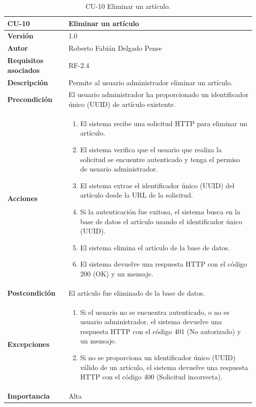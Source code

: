 \begin{table}[p]
	\centering
	\begin{tabularx}{\linewidth}{ p{} p{} }
		\toprule
		\textbf{CU-10}    & \textbf{Eliminar un artículo}\\
		\toprule
		\textbf{Versión}              & 1.0    \\
		\textbf{Autor}                & Roberto Fabián Delgado Pense \\
		\textbf{Requisitos asociados} & RF-2.4 \\ 
		\textbf{Descripción}          & Permite al usuario administrador eliminar un artículo. \\
		\textbf{Precondición}         & El usuario administrador ha proporcionado un identificador único (UUID) de artículo existente.\\
		\textbf{Acciones}             &
		\begin{enumerate}
			\def\labelenumi{\arabic{enumi}.}
			\tightlist
			\item El sistema recibe una solicitud HTTP para eliminar un artículo.
                   \item El sistema verifica que el usuario que realiza la solicitud se encuentre autenticado y tenga el  permiso de usuario administrador.
			\item El sistema extrae el identificador único (UUID) del artículo desde la URL de la solicitud.
                \item Si la autenticación fue exitosa, el sistema busca en la base de datos el artículo usando el identificador único (UUID).
                \item El sistema elimina el artículo de la base de datos.
                \item El sistema devuelve una respuesta HTTP con el código 200 (OK) y un mensaje.
            \end{enumerate}\\
		\textbf{Postcondición}        & El artículo fue eliminado de la base de datos.\\
		\textbf{Excepciones}          & 
            \begin{enumerate}
			\def\labelenumi{\arabic{enumi}.}
			\tightlist
   			\item Si el usuario no se encuentra autenticado, o no es usuario administrador, el sistema devuelve una                 respuesta HTTP con el código 401 (No autorizado) y un mensaje.
                \item Si no se proporciona un identificador único (UUID) válido de un artículo, el sistema devuelve una respuesta HTTP con el código 400 (Solicitud incorrecta).
            \end{enumerate}\\
		\textbf{Importancia}          & Alta \\
		\bottomrule
	\end{tabularx}
	\caption{CU-10 Eliminar un artículo.}
\end{table}

